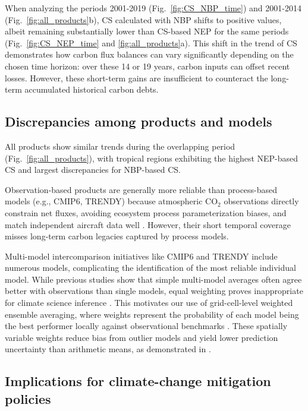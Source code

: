 \documentclass[ProofPDF]{./Styles/Jnls-Template-V3}
\begin{document}
When analyzing the periods 2001-2019 (Fig.~\ref{fig:CS_NBP_time}) and 2001-2014 (Fig.~\ref{fig:all_products}b), CS calculated with NBP shifts to positive values, albeit remaining substantially lower than CS-based NEP for the same periods (Fig.~\ref{fig:CS_NEP_time} and \ref{fig:all_products}a). This shift in the trend of CS demonstrates how carbon flux balances can vary significantly depending on the chosen time horizon: over these 14 or 19 years, carbon inputs can offset recent losses. However, these short-term gains are insufficient to counteract the long-term accumulated historical carbon debts. 

\subsection{Discrepancies among products and models}
All products show similar trends during the overlapping period (Fig.~\ref{fig:all_products}), with tropical regions exhibiting the highest NEP-based CS and largest discrepancies for NBP-based CS.

Observation-based products are generally more reliable than process-based models (e.g., CMIP6, TRENDY) because atmospheric CO$_2$ observations directly constrain net fluxes, avoiding ecosystem process parameterization biases, and match independent aircraft data well \citep{Gaubert2019,Woude2025}. However, their short temporal coverage misses long-term carbon legacies captured by process models.

Multi-model intercomparison initiatives like CMIP6 and TRENDY include numerous models, complicating the identification of the most reliable individual model. While previous studies show that simple multi-model averages often agree better with observations than single models, equal weighting proves inappropriate for climate science inference \citep{Hagedorn2005,Knutti2017}. This motivates our use of grid-cell-level weighted ensemble averaging, where weights represent the probability of each model being the best performer locally against observational benchmarks \citep{Sierra2025GDM}. These spatially variable weights reduce bias from outlier models and yield lower prediction uncertainty than arithmetic means, as demonstrated in \citet{Sierra2025GDM}.


\subsection{Implications for climate-change mitigation policies}
\end{document}
